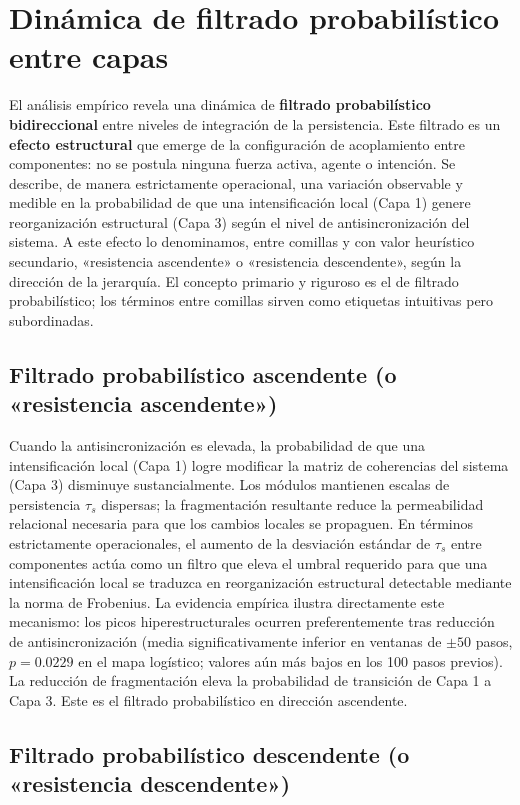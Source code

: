 \section{Dinámica de filtrado probabilístico entre capas}

El análisis empírico revela una dinámica de \textbf{filtrado probabilístico bidireccional} entre niveles de integración de la persistencia. Este filtrado es un \textbf{efecto estructural} que emerge de la configuración de acoplamiento entre componentes: no se postula ninguna fuerza activa, agente o intención. Se describe, de manera estrictamente operacional, una variación observable y medible en la probabilidad de que una intensificación local (Capa 1) genere reorganización estructural (Capa 3) según el nivel de antisincronización del sistema. A este efecto lo denominamos, entre comillas y con valor heurístico secundario, «resistencia ascendente» o «resistencia descendente», según la dirección de la jerarquía. El concepto primario y riguroso es el de filtrado probabilístico; los términos entre comillas sirven como etiquetas intuitivas pero subordinadas.

\subsection{Filtrado probabilístico ascendente (o «resistencia ascendente»)}

Cuando la antisincronización es elevada, la probabilidad de que una intensificación local (Capa 1) logre modificar la matriz de coherencias del sistema (Capa 3) disminuye sustancialmente. Los módulos mantienen escalas de persistencia $\tau_s$ dispersas; la fragmentación resultante reduce la permeabilidad relacional necesaria para que los cambios locales se propaguen. En términos estrictamente operacionales, el aumento de la desviación estándar de $\tau_s$ entre componentes actúa como un filtro que eleva el umbral requerido para que una intensificación local se traduzca en reorganización estructural detectable mediante la norma de Frobenius. La evidencia empírica ilustra directamente este mecanismo: los picos hiperestructurales ocurren preferentemente tras reducción de antisincronización (media significativamente inferior en ventanas de $\pm 50$ pasos, $p=0.0229$ en el mapa logístico; valores aún más bajos en los 100 pasos previos). La reducción de fragmentación eleva la probabilidad de transición de Capa 1 a Capa 3. Este es el filtrado probabilístico en dirección ascendente.

\subsection{Filtrado probabilístico descendente (o «resistencia descendente»)}

